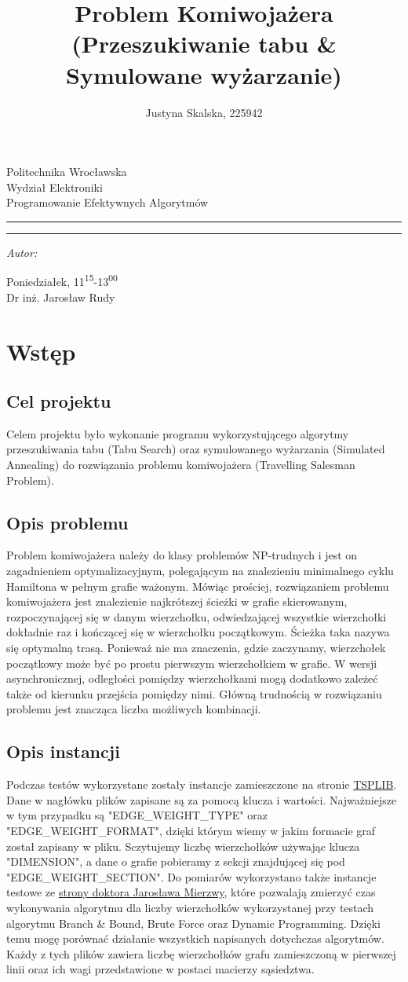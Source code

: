 \documentclass[12pt,a4paper,titlepage]{article}
\author{Justyna Skalska, 225942}
\title{Problem Komiwojażera\\
\large{(Przeszukiwanie tabu \& Symulowane wyżarzanie)}}
\makeatletter
\newcommand{\linia}{\rule{\linewidth}{0.4mm}}
\renewcommand{\maketitle}{\begin{titlepage}
    \vspace*{1cm}
    \begin{center}\small
    Politechnika Wrocławska\\
    Wydział Elektroniki\\
    Programowanie Efektywnych Algorytmów
    \end{center}
    \vspace{3cm}
    \noindent\linia
    \begin{center}
      \LARGE \textsc{\@title}
         \end{center}
     \linia
    \vspace{0.5cm}
    \begin{flushright}
    \begin{minipage}{7cm}
    \textit{\small Autor:}\\
    \normalsize \textsc{\@author} \par
    \end{minipage}
    \vspace{5cm}

     {\small Poniedziałek, 11\textsuperscript{15}-13\textsuperscript{00}}\\
        Dr inż. Jarosław Rudy
     \end{flushright}
    \vspace*{\stretch{6}}
    \begin{center}
    \@date
    \end{center}
  \end{titlepage}
}
\makeatother
\begin{document}
\maketitle
\tableofcontents

\newpage

\section{Wstęp}
\subsection{Cel projektu}
Celem projektu było wykonanie programu wykorzystującego algorytmy przeszukiwania tabu (Tabu Search) oraz symulowanego wyżarzania (Simulated Annealing) do rozwiązania problemu komiwojażera (Travelling Salesman Problem).

\subsection{Opis problemu}
Problem komiwojażera należy do klasy problemów NP-trudnych i jest on zagadnieniem optymalizacyjnym, polegającym na znalezieniu minimalnego cyklu Hamiltona w pełnym grafie ważonym. Mówiąc prościej, rozwiązaniem problemu komiwojażera jest znalezienie najkrótszej ścieżki w grafie skierowanym, rozpoczynającej się w danym wierzchołku, odwiedzającej wszystkie wierzchołki dokładnie raz i kończącej się w wierzchołku początkowym. Ścieżka taka nazywa się optymalną trasą. Ponieważ nie ma znaczenia, gdzie zaczynamy, wierzchołek początkowy może być po prostu pierwszym wierzchołkiem w grafie. W wersji asynchronicznej, odległości pomiędzy wierzchołkami mogą dodatkowo zależeć także od kierunku przejścia pomiędzy nimi. Główną trudnością w rozwiązaniu problemu jest znacząca liczba możliwych kombinacji.

\subsection{Opis instancji}
Podczas testów wykorzystane zostały instancje zamieszczone na stronie \newline \href{https://www.iwr.uni-heidelberg.de/groups/comopt/software/TSPLIB95/}{TSPLIB}. Dane w nagłówku plików zapisane są za pomocą klucza i wartości. Najważniejsze w tym przypadku są "EDGE\_WEIGHT\_TYPE" oraz "EDGE\_WEIGHT\_FORMAT", dzięki którym wiemy w jakim formacie graf został zapisany w pliku. Sczytujemy liczbę wierzchołków używając klucza "DIMENSION", a dane o grafie pobieramy z sekcji znajdującej się pod "EDGE\_WEIGHT\_SECTION". Do pomiarów wykorzystano także instancje testowe ze \href{http://jaroslaw.mierzwa.staff.iiar.pwr.wroc.pl/pea-stud/tsp/}{strony doktora Jarosława Mierzwy}, które pozwalają zmierzyć czas wykonywania algorytmu dla liczby wierzchołków wykorzystanej przy testach algorytmu Branch \& Bound, Brute Force oraz Dynamic Programming. Dzięki temu mogę porównać działanie wszystkich napisanych dotychczas algorytmów. Każdy z tych plików zawiera liczbę wierzchołków grafu zamieszczoną w pierwszej linii oraz ich wagi przedstawione w postaci macierzy sąsiedztwa.
\end{document}
